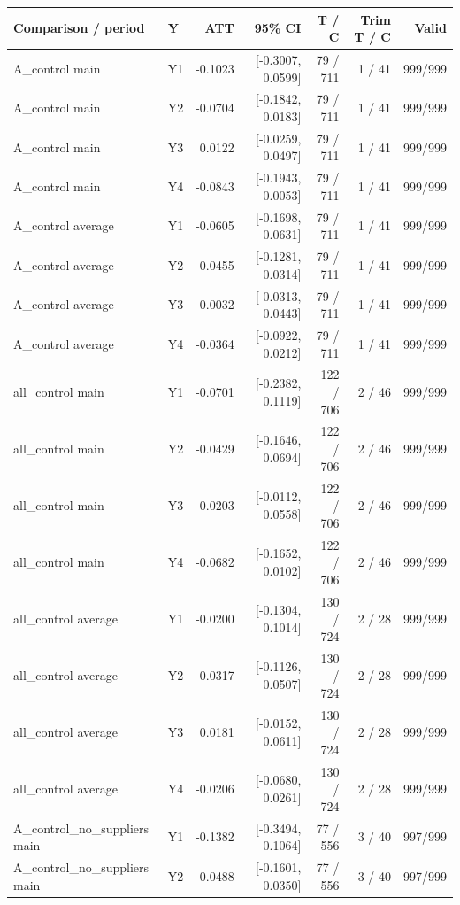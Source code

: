 \begingroup\small
\setlength{\tabcolsep}{3pt}
\begin{tabular}{llrrrrr}
\toprule
Comparison / period & Y & ATT & 95\% CI & T / C & Trim T / C & Valid \\
\midrule
A\_control main & Y1 & -0.1023 & [-0.3007, 0.0599] & 79 / 711 & 1 / 41 & 999/999 \\
A\_control main & Y2 & -0.0704 & [-0.1842, 0.0183] & 79 / 711 & 1 / 41 & 999/999 \\
A\_control main & Y3 & 0.0122 & [-0.0259, 0.0497] & 79 / 711 & 1 / 41 & 999/999 \\
A\_control main & Y4 & -0.0843 & [-0.1943, 0.0053] & 79 / 711 & 1 / 41 & 999/999 \\
A\_control average & Y1 & -0.0605 & [-0.1698, 0.0631] & 79 / 711 & 1 / 41 & 999/999 \\
A\_control average & Y2 & -0.0455 & [-0.1281, 0.0314] & 79 / 711 & 1 / 41 & 999/999 \\
A\_control average & Y3 & 0.0032 & [-0.0313, 0.0443] & 79 / 711 & 1 / 41 & 999/999 \\
A\_control average & Y4 & -0.0364 & [-0.0922, 0.0212] & 79 / 711 & 1 / 41 & 999/999 \\
all\_control main & Y1 & -0.0701 & [-0.2382, 0.1119] & 122 / 706 & 2 / 46 & 999/999 \\
all\_control main & Y2 & -0.0429 & [-0.1646, 0.0694] & 122 / 706 & 2 / 46 & 999/999 \\
all\_control main & Y3 & 0.0203 & [-0.0112, 0.0558] & 122 / 706 & 2 / 46 & 999/999 \\
all\_control main & Y4 & -0.0682 & [-0.1652, 0.0102] & 122 / 706 & 2 / 46 & 999/999 \\
all\_control average & Y1 & -0.0200 & [-0.1304, 0.1014] & 130 / 724 & 2 / 28 & 999/999 \\
all\_control average & Y2 & -0.0317 & [-0.1126, 0.0507] & 130 / 724 & 2 / 28 & 999/999 \\
all\_control average & Y3 & 0.0181 & [-0.0152, 0.0611] & 130 / 724 & 2 / 28 & 999/999 \\
all\_control average & Y4 & -0.0206 & [-0.0680, 0.0261] & 130 / 724 & 2 / 28 & 999/999 \\
A\_control\_no\_suppliers main & Y1 & -0.1382 & [-0.3494, 0.1064] & 77 / 556 & 3 / 40 & 997/999 \\
A\_control\_no\_suppliers main & Y2 & -0.0488 & [-0.1601, 0.0350] & 77 / 556 & 3 / 40 & 997/999 \\
\bottomrule
\end{tabular}
